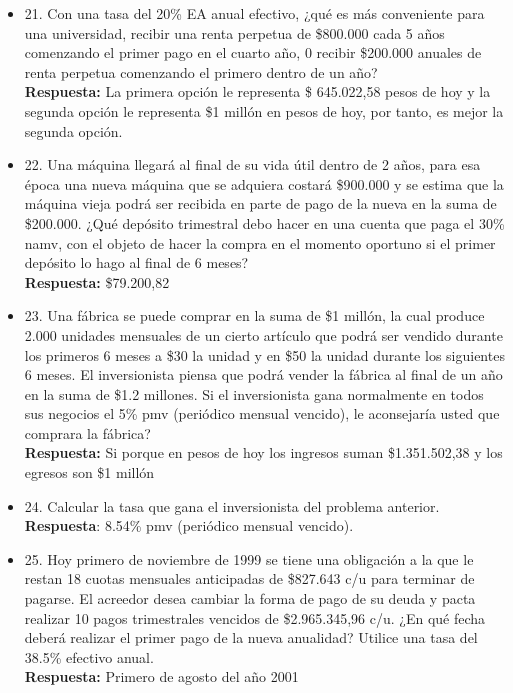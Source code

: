 \begin{itemize}
	\item 21. Con una tasa del 20\% EA anual efectivo, ¿qué es más conveniente para una universidad, recibir una renta perpetua de \$800.000 cada 5 años comenzando el primer pago en el cuarto año, 0 recibir \$200.000 anuales de renta perpetua comenzando el primero dentro de un año?\\
	      \textbf{Respuesta:} La primera opción le representa \$ 645.022,58 pesos de hoy y la segunda opción le representa \$1 millón en pesos de hoy, por tanto, es mejor la segunda opción.\\
	      \medskip
	      
	\item 22. Una máquina llegará al final de su vida útil dentro de 2 años, para esa época una nueva máquina que se adquiera costará \$900.000 y se estima que la máquina vieja podrá ser recibida en parte de pago de la nueva en la suma de \$200.000. ¿Qué depósito trimestral debo hacer en una cuenta que paga el 30\% namv, con el objeto de hacer la compra en el momento oportuno si el primer depósito lo hago al final de 6 meses?\\
	      \textbf{Respuesta:} \$79.200,82\\
	      \medskip
	      
	\item 23. Una fábrica se puede comprar en la suma de \$1 millón, la cual produce 2.000 unidades mensuales de un cierto artículo que podrá ser vendido durante los primeros 6 meses a \$30 la unidad y en \$50 la unidad durante los siguientes 6 meses. El inversionista piensa que podrá vender la fábrica al final de un año en la suma de \$1.2 millones. Si el inversionista gana normalmente en todos sus negocios el 5\% pmv (periódico mensual vencido), le aconsejaría usted que comprara la fábrica?\\
	      \textbf{Respuesta:} Si porque en pesos de hoy los ingresos suman \$1.351.502,38 y los egresos son \$1 millón\\
	      \medskip
	      
	\item 24. Calcular la tasa que gana el inversionista del problema anterior.\\
	      \textbf{Respuesta}: 8.54\% pmv (periódico mensual vencido).\\
	      \medskip
	      
	\item 25. Hoy primero de noviembre de 1999 se tiene una obligación a la que le restan 18 cuotas mensuales anticipadas de \$827.643 c/u para terminar de pagarse. El acreedor desea cambiar la forma de pago de su deuda y pacta realizar 10 pagos trimestrales vencidos de \$2.965.345,96 c/u. ¿En qué fecha deberá realizar el primer pago de la nueva anualidad? Utilice una tasa del 38.5\% efectivo anual.\\
	      \textbf{Respuesta:} Primero de agosto del año 2001\\
	      \medskip
	      

\end{itemize}
